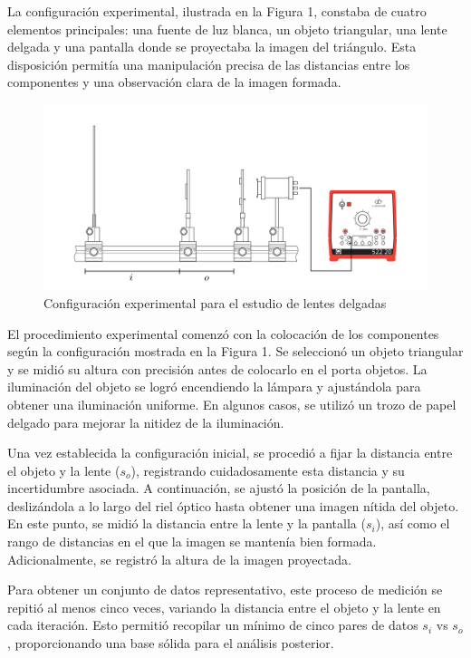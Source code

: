 \documentclass[twocolumn,a4paper,11pt]{scrartcl}
\begin{document}
La configuración experimental, ilustrada en la Figura 1, constaba de cuatro elementos principales: una fuente de luz blanca, un objeto triangular, una lente delgada y una pantalla donde se proyectaba la imagen del triángulo. Esta disposición permitía una manipulación precisa de las distancias entre los componentes y una observación clara de la imagen formada.

\begin{figure}[h]
    \centering
    \includegraphics[width=0.8\linewidth]{montaje_experimental.png}
    \caption{Configuración experimental para el estudio de lentes delgadas}
    \label{fig:setup}
\end{figure}

El procedimiento experimental comenzó con la colocación de los componentes según la configuración mostrada en la Figura 1. Se seleccionó un objeto triangular y se midió su altura con precisión antes de colocarlo en el porta objetos. La iluminación del objeto se logró encendiendo la lámpara y ajustándola para obtener una iluminación uniforme. En algunos casos, se utilizó un trozo de papel delgado para mejorar la nitidez de la iluminación.

Una vez establecida la configuración inicial, se procedió a fijar la distancia entre el objeto y la lente ($s_o$), registrando cuidadosamente esta distancia y su incertidumbre asociada. A continuación, se ajustó la posición de la pantalla, deslizándola a lo largo del riel óptico hasta obtener una imagen nítida del objeto. En este punto, se midió la distancia entre la lente y la pantalla ($s_i$), así como el rango de distancias en el que la imagen se mantenía bien formada. Adicionalmente, se registró la altura de la imagen proyectada.

Para obtener un conjunto de datos representativo, este proceso de medición se repitió al menos cinco veces, variando la distancia entre el objeto y la lente en cada iteración. Esto permitió recopilar un mínimo de cinco pares de datos $s_i$ vs $s_o$, proporcionando una base sólida para el análisis posterior.
\end{document}
